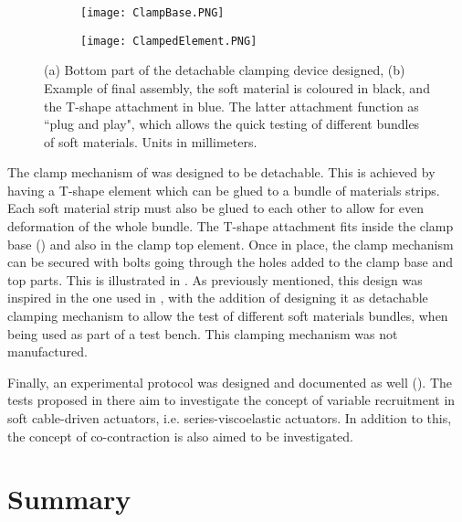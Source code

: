 \begin{figure}[htb!]
	\centering
    \begin{subfigure}[b]{0.49\textwidth}
        \centering
        \texttt{[image: ClampBase.PNG]}
        \caption{}
        \label{fig:ClampBase}
    \end{subfigure}
    \begin{subfigure}[b]{0.49\textwidth}
        \centering
        \texttt{[image: ClampedElement.PNG]}
        \caption{}
        \label{fig:ClampElement}
    \end{subfigure}
    \caption{(a) Bottom part of the detachable clamping device designed, (b) Example of final assembly, the soft material is coloured in black, and the T-shape attachment in blue. The latter attachment function as ``plug and play", which allows the quick testing of different bundles of soft materials. Units in millimeters.}
    \label{fig:ClampWhole}
\end{figure}

The clamp mechanism of  was designed to be detachable. This is achieved by having a T-shape element which can be glued to a bundle of materials strips. Each soft material strip must also be glued to each other to allow for even deformation of the whole bundle. The T-shape attachment fits inside the clamp base () and also in the clamp top element. Once in place, the clamp mechanism can be secured with bolts going through the holes added to the clamp base and top parts. This is illustrated in . As previously mentioned, this design was inspired in the one used in \cite{austin2015control}, with the addition of designing it as detachable clamping mechanism to allow the test of different soft materials bundles, when being used as part of a test bench. This clamping mechanism was not manufactured.

Finally, an experimental protocol was designed and documented as well (). The tests proposed in there aim to investigate the concept of variable recruitment in soft cable-driven actuators, i.e. series-viscoelastic actuators. In addition to this, the concept of co-contraction is also aimed to be investigated.

\section{Summary}

